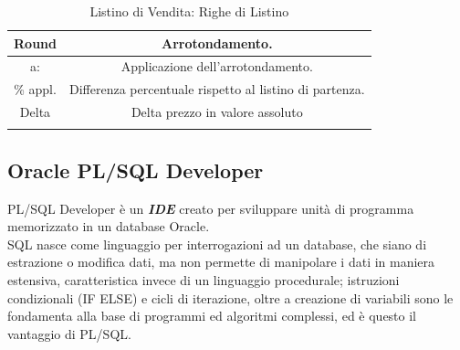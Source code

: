 \begin{longtable}{| c | c |}
	Round & Arrotondamento.\\ \hline    

	a: & Applicazione dell'arrotondamento.\\ \hline    

	\% appl. & Differenza percentuale rispetto al listino di partenza.\\ \hline    

	Delta & Delta prezzo in valore assoluto \\ \hline
	\caption{Listino di Vendita: Righe di Listino}

\end{longtable}
\newpage
\subsection{Oracle PL/SQL Developer}
PL/SQL Developer è un \textbf{\textit{IDE}} creato per sviluppare unità di programma memorizzato in un database Oracle.\\
SQL nasce come linguaggio per interrogazioni ad un database, che siano di estrazione o modifica dati, ma non permette di manipolare i dati in maniera estensiva, caratteristica invece di un linguaggio procedurale; istruzioni condizionali (IF ELSE) e cicli di iterazione, oltre a creazione di variabili sono le fondamenta alla base di programmi ed algoritmi complessi, ed è questo il vantaggio di PL/SQL.\\

